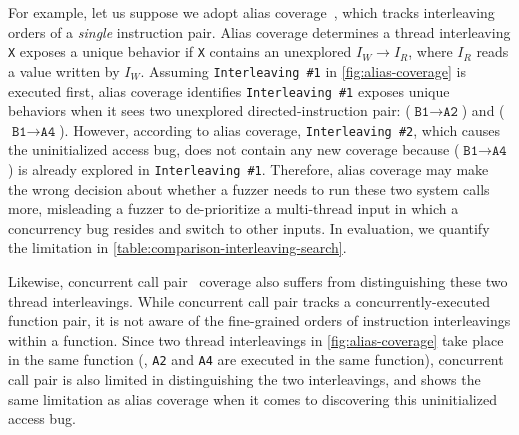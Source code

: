 For example, let us suppose we adopt alias coverage~\cite{krace},
which tracks interleaving orders of a \textit{single} instruction
pair.
%
Alias coverage determines a thread interleaving \texttt{X} exposes a
unique behavior if \texttt{X} contains an unexplored
 $I_W \rightarrow I_R$, where $I_R$
reads a value written by $I_W$.
%
Assuming \texttt{Interleaving \#1} in \autoref{fig:alias-coverage} is
executed first, alias coverage identifies \texttt{Interleaving \#1}
exposes unique behaviors when it sees two unexplored
directed-instruction pair: ($\texttt{B1} \rightarrow \texttt{A2}$) and
($\texttt{B1} \rightarrow \texttt{A4}$).
%
However, according to alias coverage, \texttt{Interleaving \#2}, which
causes the uninitialized access bug, does not contain any new coverage
because ($\texttt{B1} \rightarrow \texttt{A4}$) is already explored in
\texttt{Interleaving \#1}.
%
Therefore, alias coverage may make the wrong decision about whether a
fuzzer needs to run these two system calls more, misleading a fuzzer
to de-prioritize a multi-thread input in which a concurrency bug
resides and switch to other inputs. In evaluation, we quantify the
limitation in \autoref{table:comparison-interleaving-search}.

Likewise, concurrent call pair~\cite{conzzer} coverage also suffers from
distinguishing these two thread interleavings.
%
While concurrent call pair tracks a concurrently-executed function
pair, it is not aware of the fine-grained orders of instruction interleavings within a function.
%
Since two thread interleavings in \autoref{fig:alias-coverage} take
place in the same function (\ie, \texttt{A2} and \texttt{A4} are
executed in the same function), concurrent call pair is also limited
in distinguishing the two interleavings, and shows the same limitation
as alias coverage when it comes to discovering this uninitialized
access bug.

